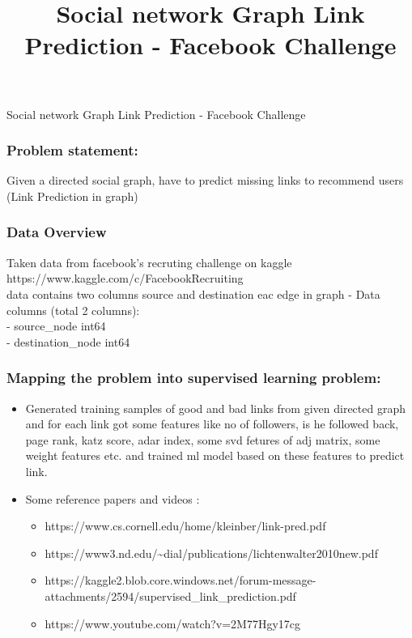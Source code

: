 \documentclass[11pt]{article}
\title{Social network Graph Link Prediction - Facebook Challenge}
\providecommand{\tightlist}{%
      \setlength{\itemsep}{0pt}\setlength{\parskip}{0pt}}
\begin{document}
    
    
    \maketitle
    
    

    
    Social network Graph Link Prediction - Facebook Challenge

    \subsubsection{Problem statement:}\label{problem-statement}

Given a directed social graph, have to predict missing links to
recommend users (Link Prediction in graph)

    \subsubsection{Data Overview}\label{data-overview}

Taken data from facebook's recruting challenge on kaggle
https://www.kaggle.com/c/FacebookRecruiting\\
data contains two columns source and destination eac edge in graph -
Data columns (total 2 columns):\\
- source\_node int64\\
- destination\_node int64

    \subsubsection{Mapping the problem into supervised learning
problem:}\label{mapping-the-problem-into-supervised-learning-problem}

\begin{itemize}
\tightlist
\item
  Generated training samples of good and bad links from given directed
  graph and for each link got some features like no of followers, is he
  followed back, page rank, katz score, adar index, some svd fetures of
  adj matrix, some weight features etc. and trained ml model based on
  these features to predict link.
\item
  Some reference papers and videos :

  \begin{itemize}
  \tightlist
  \item
    https://www.cs.cornell.edu/home/kleinber/link-pred.pdf
  \item
    https://www3.nd.edu/\textasciitilde{}dial/publications/lichtenwalter2010new.pdf
  \item
    https://kaggle2.blob.core.windows.net/forum-message-attachments/2594/supervised\_link\_prediction.pdf
  \item
    https://www.youtube.com/watch?v=2M77Hgy17cg
  \end{itemize}
\end{itemize}
\end{document}
